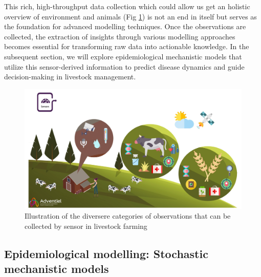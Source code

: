 This rich, high-throughput data collection which could allow us get an holistic overview of environment and animals (Fig \ref{fig:chap1-sensors}) is not an end in itself but serves as the foundation for advanced modelling techniques. Once the observations are collected, the extraction of insights through various modelling approaches becomes essential for transforming raw data into actionable knowledge. In the subsequent section, we will explore epidemiological mechanistic models that utilize this sensor-derived information to predict disease dynamics and guide decision-making in livestock management.

\begin{figure}
  \includegraphics[width=\linewidth]{figures/chap1/chap1-sensors.jpg}
  \caption{Illustration of the diversere categories of observations that can be collected by sensor in livestock farming}
  \label{fig:chap1-sensors}
\end{figure}
\newpage





\subsection{Epidemiological modelling: Stochastic mechanistic models}

